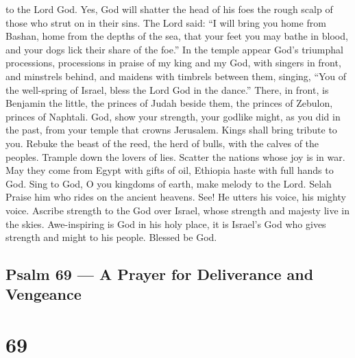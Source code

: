 to the Lord God.  Yes, God will shatter the head of his
foes the rough scalp of those who strut on in their sins. 
The Lord said: ``I will bring you home from Bashan, home from the depths
of the sea,  that your feet you may bathe in blood, and
your dogs lick their share of the foe.''  In the temple
appear God's triumphal processions, processions in praise of my king and
my God,  with singers in front, and minstrels behind, and
maidens with timbrels between them, singing,  ``You of the
well-spring of Israel, bless the Lord God in the dance.'' 
There, in front, is Benjamin the little, the princes of Judah beside
them, the princes of Zebulon, princes of Naphtali.  God,
show your strength, your godlike might, as you did in the past,
 from your temple that crowns Jerusalem. Kings shall bring
tribute to you.  Rebuke the beast of the reed, the herd of
bulls, with the calves of the peoples. Trample down the lovers of lies.
Scatter the nations whose joy is in war.  May they come
from Egypt with gifts of oil, Ethiopia haste with full hands to God.
 Sing to God, O you kingdoms of earth, make melody to the
Lord. Selah  Praise him who rides on the ancient heavens.
See! He utters his voice, his mighty voice.  Ascribe
strength to the God over Israel, whose strength and majesty live in the
skies.  Awe-inspiring is God in his holy place, it is
Israel's God who gives strength and might to his people. Blessed be God.

\hypertarget{psalm-69-a-prayer-for-deliverance-and-vengeance}{%
\subsection{Psalm 69 --- A Prayer for Deliverance and
Vengeance}\label{psalm-69-a-prayer-for-deliverance-and-vengeance}}

\hypertarget{section-68}{%
\section{69}\label{section-68}}

